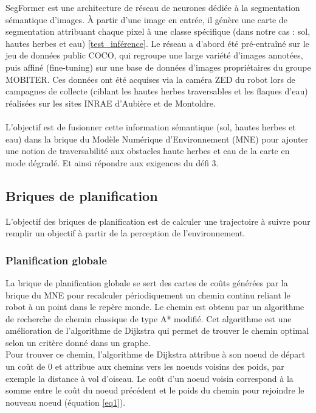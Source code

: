 \indent SegFormer est une architecture de réseau de neurones dédiée à la segmentation sémantique d'images. À partir d'une image en entrée, il génère une carte de segmentation attribuant chaque pixel à une classe spécifique (dans notre cas : sol, hautes herbes et eau) \hyperref[annexe8]{[test\_inférence]}. Le réseau a d'abord été pré-entraîné sur le jeu de données public COCO, qui regroupe une large variété d'images annotées, puis affiné (fine-tuning) sur une base de données d'images propriétaires du groupe MOBITER. Ces données ont été acquises via la caméra ZED du robot lors de campagnes de collecte (ciblant les hautes herbes traversables et les flaques d'eau) réalisées sur les sites INRAE d'Aubière et de Montoldre.\\\\
\indent L'objectif est de fusionner cette information sémantique (sol, hautes herbes et eau) dans la brique du Modèle Numérique d'Environnement (MNE) pour ajouter une notion de traversabilité aux obstacles haute herbes et eau de la carte en mode dégradé. Et ainsi répondre aux exigences du défi 3.



\subsection{Briques de planification}
L'objectif des briques de planification est de calculer une trajectoire à suivre pour remplir un objectif à partir de la perception de l'environnement.

\subsubsection{Planification globale}
La brique de planification globale se sert des cartes de coûts générées par la brique du MNE pour recalculer périodiquement un chemin continu reliant le robot à un point dans le repère monde. Le chemin est obtenu par un algorithme de recherche de chemin classique de type A* \cite{hart1968formal} modifié. Cet algorithme est une amélioration de l'algorithme de Dijkstra \cite{dijkstra1959note} qui permet de trouver le chemin optimal selon un critère donné dans un graphe. \\

\indent Pour trouver ce chemin, l'algorithme de Dijkstra attribue à son noeud de départ un coût de 0 et attribue aux chemins vers les noeuds voisins des poids, par exemple la distance à vol d'oiseau. Le coût d'un noeud voisin correspond à la somme entre le coût du noeud précédent et le poids du chemin pour rejoindre le nouveau noeud (équation \eqref{eq1}).

